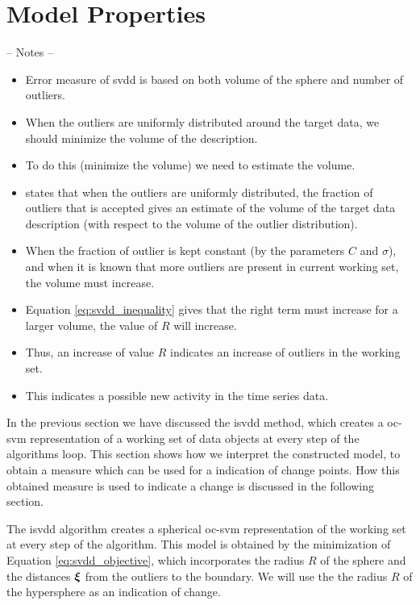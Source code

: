 \section{Model Properties}\label{sec:method_model_properties}

-- Notes --
\begin{itemize}
  \item Error measure of \gls{svdd} is based on both volume of the sphere and number of outliers.
  \item When the outliers are uniformly distributed around the target data, we should minimize the volume of the description.
  \item To do this (minimize the volume) we need to estimate the volume.
  \item \cite{tax2002uniform} states that when the outliers are uniformly distributed, the fraction of outliers that is accepted gives an estimate of the volume of the target data description (with respect to the volume of the outlier distribution).
  \item When the fraction of outlier is kept constant (by the parameters $C$ and $\sigma$), and when it is known that more outliers are present in current working set, the volume must increase.
  \item Equation \ref{eq:svdd_inequality} gives that the right term must increase for a larger volume, \ie the value of $R$ will increase.
  \item Thus, an increase of value $R$ indicates an increase of outliers in the working set.
  \item This indicates a possible new activity in the time series data.
\end{itemize}

In the previous section we have discussed the \gls{isvdd} method, which creates a \gls{oc-svm} representation of a working set of data objects at every step of the algorithms loop.
This section shows how we interpret the constructed model, to obtain a measure which can be used for a indication of change points.
How this obtained measure is used to indicate a change is discussed in the following section.

The \gls{isvdd} algorithm creates a spherical \gls{oc-svm} representation of the working set at every step of the algorithm.
This model is obtained by the minimization of Equation \ref{eq:svdd_objective}, which incorporates the radius $R$ of the sphere and the distances $\vectorsym{\xi}$ from the outliers to the boundary.
We will use the the radius $R$ of the hypersphere as an indication of change.

